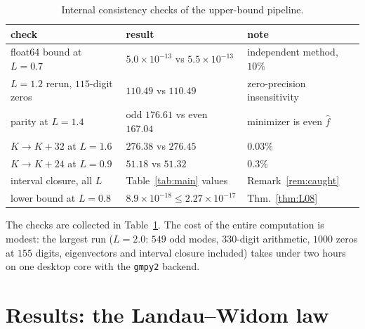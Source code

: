 ﻿\documentclass[11pt]{article}
\newcommand{\fhat}{\hat f}
\begin{document}
\begin{table}[t]
  \centering
  \small
  \begin{tabular}{lll}
    \toprule
    check & result & note\\
    \midrule
    float64 bound at $L=0.7$ &
    $5.0\times10^{-13}$ vs $5.5\times10^{-13}$ &
    independent method, $10\%$\\
    $L=1.2$ rerun, $115$-digit zeros &
    $110.49$ vs $110.49$ & zero-precision insensitivity\\
    parity at $L=1.4$ &
    odd $176.61$ vs even $167.04$ & minimizer is even $\fhat$\\
    $K\!\to\!K+32$ at $L=1.6$ &
    $276.38$ vs $276.45$ & $0.03\%$\\
    $K\!\to\!K+24$ at $L=0.9$ &
    $51.18$ vs $51.32$ & $0.3\%$\\
    interval closure, all $L$ &
    Table~\ref{tab:main} values & Remark~\ref{rem:caught}\\
    lower bound at $L=0.8$ &
    $8.9\times10^{-18}\le2.27\times10^{-17}$ & Thm.~\ref{thm:L08}\\
    \bottomrule
  \end{tabular}
  \caption{Internal consistency checks of the upper-bound pipeline.}
  \label{tab:checks}
\end{table}

The checks are collected in Table~\ref{tab:checks}.  The cost of the
entire computation is modest: the largest run ($L=2.0$: $549$ odd
modes, $330$-digit arithmetic, $1000$ zeros at $155$ digits,
eigenvectors and interval closure included) takes under two hours on
one desktop core with the \texttt{gmpy2} backend.

\section{Results: the Landau--Widom law}\label{sec:results}
\end{document}
